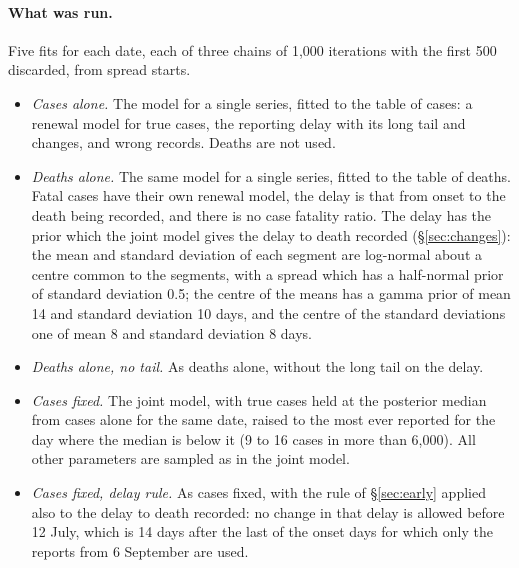 \documentclass[11pt,a4paper]{article}
\begin{document}
\paragraph{What was run.} Five fits for each date, each of three chains of
1{,}000 iterations with the first 500 discarded, from spread starts.
\begin{itemize}
\item \emph{Cases alone.} The model for a single series, fitted to the
table of cases: a renewal model for true cases, the reporting delay with
its long tail and changes, and wrong records. Deaths are not used.
\item \emph{Deaths alone.} The same model for a single series, fitted to the
table of deaths. Fatal cases have their own renewal model, the delay is
that from onset to the death being recorded, and there is no case fatality
ratio. The delay has the prior which the joint model gives the delay to
death recorded (\S\ref{sec:changes}): the mean and standard deviation of
each segment are log-normal about a centre common to the segments, with a
spread which has a half-normal prior of standard deviation 0.5; the centre
of the means has a gamma prior of mean 14 and standard deviation 10 days,
and the centre of the standard deviations one of mean 8 and standard
deviation 8 days.
\item \emph{Deaths alone, no tail.} As deaths alone, without the long tail
on the delay.
\item \emph{Cases fixed.} The joint model, with true cases held at the
posterior median from cases alone for the same date, raised to the most
ever reported for the day where the median is below it (9 to 16 cases in
more than 6{,}000). All other parameters are sampled as in the joint model.
\item \emph{Cases fixed, delay rule.} As cases fixed, with the rule of
\S\ref{sec:early} applied also to the delay to death recorded: no change
in that delay is allowed before 12 July, which is 14 days after the last
of the onset days for which only the reports from 6 September are used.
\end{itemize}
\end{document}
